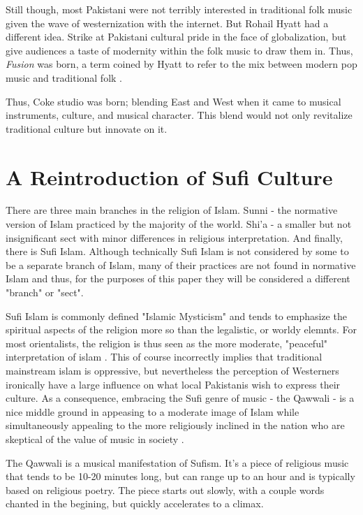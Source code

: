 \documentclass{article}
\begin{document}
  Still though, most Pakistani were not terribly interested in traditional folk 
  music given the wave of westernization with the internet. But Rohail Hyatt had a 
  different idea. Strike at Pakistani cultural pride in the face of globalization, but 
  give audiences a taste of modernity within the folk music to draw them in. Thus, 
  \textit{Fusion} was born, a term coined by Hyatt to refer to the mix between modern pop music
  and traditional folk \autocite{dhanwani2014coke}.

  Thus, Coke studio was born; blending East and West when it came to musical
  instruments, culture, and musical character. This blend would not only
  revitalize traditional culture but innovate on it. 

  \section{A Reintroduction of Sufi Culture}

  There are three main branches in the religion of Islam. Sunni - the normative
  version of Islam practiced by the majority of the world. Shi'a - a smaller but
  not insignificant sect with minor differences in religious interpretation. And
  finally, there is Sufi Islam. Although technically Sufi Islam is not
  considered by some to be a separate branch of Islam, many of their practices
  are not found in normative Islam and thus, for the purposes of this paper they
  will be considered a different "branch" or "sect". 

  Sufi Islam is commonly defined "Islamic Mysticism" and tends to emphasize the 
  spiritual aspects of the religion more so than the legalistic, or worldy
  elemnts. For most orientalists, the religion is thus seen as the more 
  moderate, "peaceful" interpretation of islam \autocite{beg2020fizzy}. This of
  course incorrectly implies that traditional mainstream islam is oppressive,
  but nevertheless the perception of Westerners ironically have a large
  influence on what local Pakistanis wish to express their culture. As a
  consequence, embracing the Sufi genre of music - the Qawwali - is a nice
  middle ground in appeasing to a moderate image of Islam while simultaneously 
  appealing to the more religiously inclined in the nation who are skeptical of
  the value of music in society \autocite{beg2020fizzy}.

  The Qawwali is a musical manifestation of Sufism. It's a piece of religious music 
  that tends to be 10-20 minutes long, but can range up to an hour and is typically 
  based on religious poetry. The piece starts out slowly, with a couple words chanted
  in the begining, but quickly accelerates to a climax. 







  \nocite{*}
  \printbibliography
\end{document}
